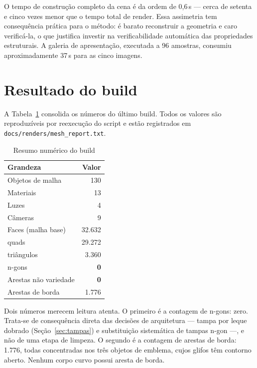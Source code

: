 O tempo de constru{\c{c}}\~ao completo da cena \'e da ordem de 0,6\,s --- cerca de
setenta e cinco vezes menor que o tempo total de render. Essa assimetria tem
consequ\^encia pr\'atica para o m\'etodo: \'e barato reconstruir a geometria e caro
verific\'a-la, o que justifica investir na verificabilidade autom\'atica das propriedades
estruturais. A galeria de apresenta{\c{c}}\~ao, executada a 96 amostras, consumiu
aproximadamente 37\,s para as cinco imagens.

\section{Resultado do build}

A Tabela~\ref{tab:build} consolida os n\'umeros do \'ultimo build. Todos os valores s\~ao
reproduz\'iveis por reexecu{\c{c}}\~ao do script e est\~ao registrados em
\texttt{docs/renders/mesh\_report.txt}.

\begin{table}[htbp]
\centering
\caption{Resumo num\'erico do build}
\label{tab:build}
\footnotesize
\begin{tabular}{>{\raggedright\arraybackslash}p{7.2cm}r}
\toprule
\textbf{Grandeza} & \textbf{Valor} \\
\midrule
Objetos de malha & 130 \\
Materiais & 13 \\
Luzes & 4 \\
C\^ameras & 9 \\
Faces (malha base) & 32.632 \\
\quad quads & 29.272 \\
\quad tri\^angulos & 3.360 \\
\quad n-gons & \textbf{0} \\
Arestas n\~ao variedade & \textbf{0} \\
Arestas de borda & 1.776 \\
\bottomrule
\end{tabular}
\end{table}

Dois n\'umeros merecem leitura atenta. O primeiro \'e a contagem de n-gons: zero. Trata-se de
consequ\^encia direta das decis\~oes de arquitetura --- tampa por leque dobrado
(Se{\c{c}}\~ao~\ref{sec:tampas}) e substitui{\c{c}}\~ao sistem\'atica de tampas n-gon ---, e n\~ao
de uma etapa de limpeza. O segundo \'e a contagem de arestas de borda: 1.776, todas
concentradas nos tr\^es objetos de emblema, cujos glifos t\^em contorno aberto. Nenhum corpo
curvo possui aresta de borda.

